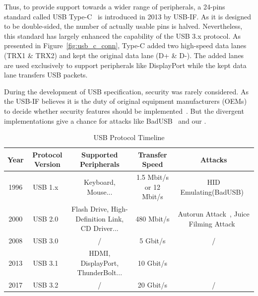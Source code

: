 Thus, to provide support towards a wider range of peripherals, a 24-pins
standard called USB Type-C~\cite{typec} is introduced in 2013 by USB-IF. As it is designed to be double-sided, the number of actually usable
pins is halved. Nevertheless, this standard has largely enhanced the capability
of the USB 3.x protocol. As presented in Figure~\ref{fig:usb_c_conn}, Type-C added
two high-speed data lanes (TRX1 \& TRX2) and kept the original data lane (D+ \&
D-). The added lanes are used exclusively to support peripherals like
DisplayPort while the kept data lane transfers USB packets.

During the development of USB specification, security was rarely considered. As
the USB-IF believes it is the duty of original equipment manufacturers (OEMs)
to decide whether security features should be implemented~\cite{usbsec}. But the divergent implementations give a chance for attacks like
BadUSB~\cite{rubber} and our \tool.

\begin{table}
\begin{tabular}{|c|c|c|c|c|}
	\hline
	Year & Protocol Version & Supported Peripherals & Transfer Speed & Attacks \\
	\hline
	1996 & USB 1.x~\cite{usb10,usb11} & Keyboard, Mouse... & 1.5 Mbit/s or 12 Mbit/s & HID Emulating(BadUSB)~\cite{badusb} \\
	\hline
	2000 & USB 2.0~\cite{usb20} & Flash Drive, High-Definition Link, CD Driver... & 480 Mbit/s & Autorun Attack~\cite{duqu}, Juice Filming Attack~\cite{JFC,JFCImpact} \\
	\hline
	2008 & USB 3.0~\cite{usb30} & / & 5 Gbit/s & / \\
	\hline
	2013 & USB 3.1~\cite{usb31} & HDMI, DisplayPort, ThunderBolt... & 10 Gbit/s & \tool \\
	\hline
	2017 & USB 3.2~\cite{usb32} & / & 20 Gbit/s & / \\
	\hline
\end{tabular}
	\linebreak
\caption{USB Protocol Timeline}
\label{table:usb_timeline}
\end{table}
